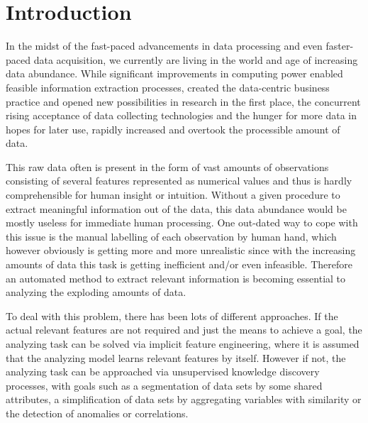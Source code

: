 \chapter{Introduction}\label{ch:intro}

In the midst of the fast-paced advancements in data processing and even faster-paced data acquisition, we currently are living in the world and age of increasing data abundance. While significant improvements in computing power enabled feasible information extraction processes, created the data-centric business practice and opened new possibilities in research in the first place, the concurrent rising acceptance of data collecting technologies and the hunger for more data in hopes for later use, rapidly increased and overtook the processible amount of data. 

This raw data often is present in the form of vast amounts of observations consisting of several features represented as numerical values and thus is hardly comprehensible for human insight or intuition. Without a given procedure to extract meaningful information out of the data, this data abundance would be mostly useless for immediate human processing. One out-dated way to cope with this issue is the manual labelling of each observation by human hand, which however obviously is getting more and more unrealistic since with the increasing amounts of data this task is getting inefficient and/or even infeasible. Therefore an automated method to extract relevant information is becoming essential to analyzing the exploding amounts of data. %

To deal with this problem, there has been lots of different approaches.
If the actual relevant features are not required and just the means to achieve a goal, the analyzing task can be solved via implicit feature engineering, where it is assumed that the analyzing model learns relevant features by itself.
However if not, the analyzing task can be approached via unsupervised knowledge discovery processes, with goals such as a segmentation of data sets by some shared attributes, a simplification of data sets by aggregating variables with similarity or the detection of anomalies or correlations.

